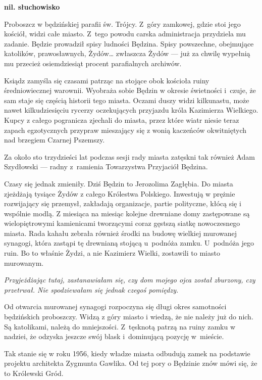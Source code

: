 \documentclass[11pt,a4paper,oneside]{article}
\begin{document}
\noindent
\textbf{nil. słuchowisko}

Proboszcz w będzińskiej parafii św. Trójcy. Z~góry zamkowej,
gdzie stoi jego kościół, widzi całe miasto. Z~tego powodu carska
administracja przydziela mu zadanie. Będzie prowadził spisy ludności
Będzina. Spisy powszechne, obejmujące katolików, prawosławnych,
Żydów\dots{} zwłaszcza Żydów --- już za chwilę wypełnią mu przecież
osiemdziesiąt procent parafialnych archiwów.

Ksiądz zamyśla się czasami patrząc na stojące obok kościoła ruiny
średniowiecznej warownii. Wyobraża sobie Będzin w okresie świetności
i~czuje, że sam staje się częścią historii tego miasta. Oczami
duszy widzi kilkunastu, może nawet kilkudziesięciu rycerzy
oczekujących przyjazdu króla Kazimierza Wielkiego. Kupcy z całego 
pogranicza zjechali do miasta, przez które wiatr niesie teraz zapach
egzotycznych przypraw mieszający się z wonią kaczeńców okwitniętych
nad brzegiem Czarnej Pszemszy.

Za około sto trzydzieści lat podczas sesji rady miasta zatęskni tak również Adam
Szydłowski --- radny z~ramienia Towarzystwa Przyjaciół Będzina.

Czasy się jednak zmieniły. Dziś Będzin to Jerozolima Zagłębia. Do
miasta zjeżdżają tysiące Żydów z całego Królestwa Polskiego. Inwestują
w prężnie rozwijający się przemysł, zakładają organizacje, partie
polityczne, kłócą się i wspólnie modlą. Z miesiąca na miesiąc kolejne
drewniane domy zastępowane są wielopiętrowymi kamienicami tworzącymi
coraz gęstszą siatkę nowoczesnego miasta. Rada kahału zebrała również
środki na budowę wielkiej murowanej synagogi, która zastąpi tę
drewnianą stojącą u~podnóża zamku. U~podnóża jego ruin. Bo to
właśnie Żydzi, a nie Kazimierz Wielki, zostawili to miasto murowanym.

\emph{Przyjeżdżając tutaj, zastanawiałam się, czy dom mojego ojca został
zburzony, czy przetrwał. Nie spodziewałam się jednak czegoś pomiędzy.}

Od otwarcia murowanej synagogi rozpoczyna się długi okres samotności
będzińskich proboszczy. Widzą z góry miasto i wiedzą, że nie należy
już do nich. Są katolikami, należą do mniejszości. Z~tęsknotą patrzą
na ruiny zamku w nadziei, że odzyska jeszcze swój blask i~dominującą
pozycję w~mieście.

Tak stanie się w roku 1956, kiedy władze miasta odbudują zamek na
podstawie projektu architekta Zygmunta Gawlika. Od tej pory o Będzinie
znów mówi się, że to Królewski Gród.
\end{document}
